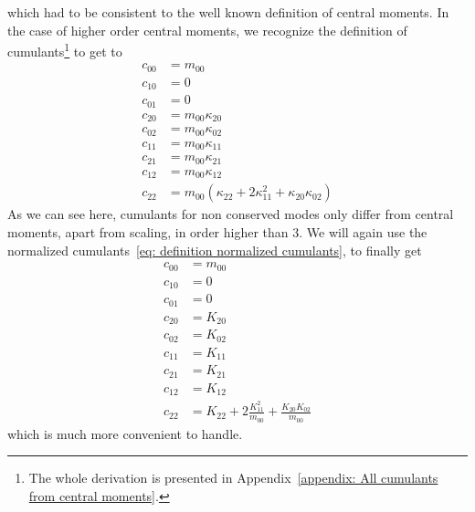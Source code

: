 which had to be consistent to the well known definition of central moments.
In the case of higher order central moments, we recognize the definition of cumulants\footnote{The whole derivation is presented in Appendix~\ref{appendix: All cumulants from central moments}.} to get to
\begin{equation}
  \label{eq: all central moments from cumulants}
  \begin{aligned}
    c_{00} & = m_{00} \\
    c_{10} & = 0 \\
    c_{01} & = 0 \\
    c_{20} & = m_{00}\kappa_{20} \\
    c_{02} & = m_{00}\kappa_{02} \\
    c_{11} & = m_{00}\kappa_{11} \\
    c_{21} & = m_{00}\kappa_{21} \\
    c_{12} & = m_{00}\kappa_{12} \\
    c_{22} & = m_{00}(\kappa_{22} + 2\kappa_{11}^2 + \kappa_{20}\kappa_{02})
  \end{aligned}
\end{equation}
As we can see here, cumulants for non conserved modes only differ from central moments, apart from scaling, in order higher than $3$.
We will again use the normalized cumulants~\eqref{eq: definition normalized cumulants}, to finally get
\begin{equation}
  \label{eq: all central moments from normalized cumulants}
  \begin{aligned}
    c_{00} & = m_{00}\\
    c_{10} & = 0 \\
    c_{01} & = 0 \\
    c_{20} & = K_{20} \\
    c_{02} & = K_{02} \\
    c_{11} & = K_{11} \\
    c_{21} & = K_{21} \\
    c_{12} & = K_{12} \\
    c_{22} & = K_{22} + 2 \frac{K_{11}^2}{m_{00}} + \frac{K_{20}K_{02}}{m_{00}}
  \end{aligned}
\end{equation}
which is much more convenient to handle.
